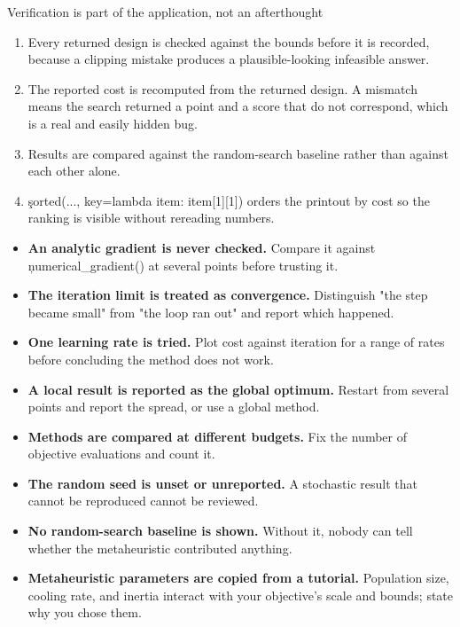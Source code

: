 \begin{SyntaxBox}{Verification is part of the application, not an afterthought}
\begin{enumerate}
    \item Every returned design is checked against the bounds before it is
          recorded, because a clipping mistake produces a plausible-looking
          infeasible answer.
    \item The reported cost is recomputed from the returned design. A mismatch
          means the search returned a point and a score that do not correspond,
          which is a real and easily hidden bug.
    \item Results are compared against the random-search baseline rather than
          against each other alone.
    \item \c{sorted(..., key=lambda item: item[1][1])} orders the printout by
          cost so the ranking is visible without rereading numbers.
\end{enumerate}
\end{SyntaxBox}


\begin{itemize}
    \item \textbf{An analytic gradient is never checked.} Compare it against
          \c{numerical_gradient()} at several points before trusting it.
    \item \textbf{The iteration limit is treated as convergence.} Distinguish
          "the step became small" from "the loop ran out" and report which
          happened.
    \item \textbf{One learning rate is tried.} Plot cost against iteration for a
          range of rates before concluding the method does not work.
    \item \textbf{A local result is reported as the global optimum.} Restart
          from several points and report the spread, or use a global method.
    \item \textbf{Methods are compared at different budgets.} Fix the number of
          objective evaluations and count it.
    \item \textbf{The random seed is unset or unreported.} A stochastic result
          that cannot be reproduced cannot be reviewed.
    \item \textbf{No random-search baseline is shown.} Without it, nobody can
          tell whether the metaheuristic contributed anything.
    \item \textbf{Metaheuristic parameters are copied from a tutorial.}
          Population size, cooling rate, and inertia interact with your
          objective's scale and bounds; state why you chose them.
\end{itemize}

